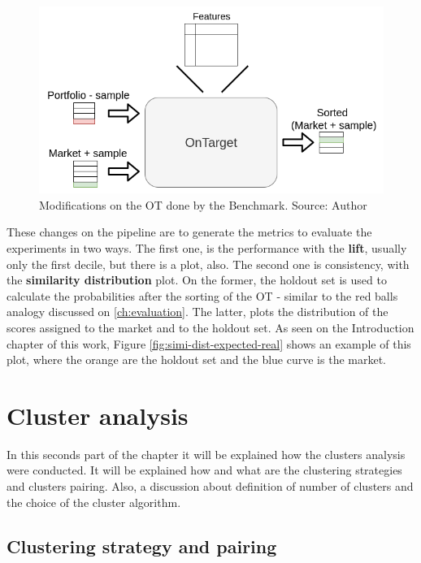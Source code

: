 \begin{figure}[h]
   \centering
   \includegraphics[width=\linewidth]{fig/ch3-ot-benchmark-blocks.png}
   \caption{Modifications on the OT done by the Benchmark. Source: Author}
   \label{fig:ot-benchmark-blocks}
\end{figure}

These changes on the pipeline are to generate the metrics to evaluate the experiments in two ways. The first one, is the performance with the \textbf{lift}, usually only the first decile, but there is a plot, also. The second one is consistency, with the \textbf{similarity distribution} plot. On the former, the holdout set is used to calculate the probabilities after the sorting of the OT - similar to the red balls analogy discussed on \ref{ch:evaluation}. The latter, plots the distribution of the scores assigned to the market and to the holdout set. As seen on the Introduction chapter of this work, Figure \ref{fig:simi-dist-expected-real} shows an example of this plot, where the orange are the holdout set and the blue curve is the market.

\section{Cluster analysis}

In this seconds part of the chapter it will be explained how the clusters analysis were conducted. It will be explained how and what are the clustering strategies and clusters pairing. Also, a discussion about definition of number of clusters and the choice of the cluster algorithm.

\subsection{Clustering strategy and pairing}

